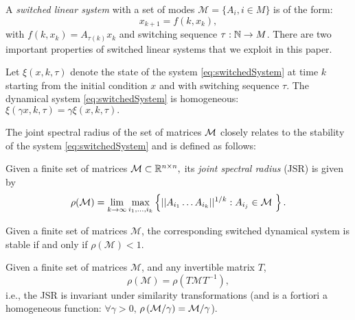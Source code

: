 A \emph{switched linear system} with a set of modes \mbox{$\mathcal{M}= \{A_i, i \in M \}$} is of the form:
\begin{equation}\label{eq:switchedSystem}x_{k+1} = f(k,x_k),\end{equation}
with $f(k,x_k) = A_{\tau(k)}x_k$ and switching sequence \mbox{$\tau: \mathbb{N} \to M$.} There are two important properties of switched linear systems that we exploit in this paper.
\begin{property}\label{property:homogeneity}
Let $\xi(x, k, \tau)$ denote the state of the system \eqref{eq:switchedSystem} at time $k$ starting from the initial condition $x$ and with switching sequence $\tau$. The dynamical system \eqref{eq:switchedSystem} is homogeneous: $\xi(\gamma x, k, \tau)= \gamma \xi(x, k, \tau).$
\end{property}



The joint spectral radius of the set of matrices $\mathcal{M}$ closely relates to the stability of the system \eqref{eq:switchedSystem} and is defined as follows:
\begin{definition} Given a finite set of matrices \mbox{$\mathcal{M} \subset \mathbb{R}^{n\times n},$} its \emph{joint spectral radius} (JSR) is given by
$$\rho(\mathcal{M}) =\lim_{k\rightarrow \infty} \max_{i_1,\dots, i_k} \left\{||A_{i_1} \dots A_{i_k}||^{1/k}: A_{i_j}\in\mathcal{M}\ \right\}. $$
\end{definition}

\begin{property}
Given a finite set of matrices $\mathcal{M}$, the corresponding switched dynamical system is stable if and only if $\rho(\mathcal{M})<1$.
\end{property}

\begin{property}\label{rem:scaling}
Given a finite set of matrices $\mathcal{M}$, and any invertible matrix $T$, 
$$\rho(\mathcal{M})=\rho(T \mathcal{M} T^{-1}),$$
i.e., the JSR is invariant under similarity transformations (and is a fortiori a homogeneous function: $\forall \gamma > 0,\,$\linebreak$\rho\left(\mathcal{M}/\gamma\right)=\mathcal{M}/\gamma$).
\end{property}